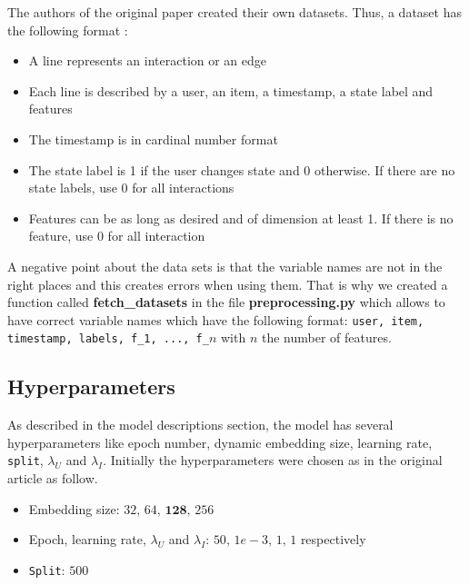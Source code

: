 The authors of the original paper created their own datasets. Thus, a dataset has the following format :
\begin{itemize}
    \item A line represents an interaction or an edge
    \item Each line is described by a user, an item, a timestamp, a state label and features
    \item The timestamp is in cardinal number format
    \item The state label is 1 if the user changes state and 0 otherwise. If there are no state labels, use 0 for all interactions
    \item Features can be as long as desired and of dimension at least 1. If there is no feature, use 0 for all interaction
\end{itemize}
A negative point about the data sets is that the variable names are not in the right places and this creates errors when using them. That is why we created a function called \textbf{fetch\_datasets} in the file \textbf{preprocessing.py} which allows to have correct variable names which have the following format: \texttt{user, item, timestamp, labels, f\_1, ..., f\_$n$} with $n$ the number of features.\\

\subsection*{Hyperparameters}

As described in the model descriptions section, the model has several hyperparameters like epoch number, dynamic embedding size, learning rate, \texttt{split}, $\lambda_U$ and $\lambda_I$. Initially the hyperparameters were chosen as in the original article as follow.

\begin{itemize}
    \item Embedding size: $32, \, 64, \, \boldsymbol{128}, \, 256$
    \item Epoch, learning rate, $\lambda_U$ and $\lambda_I$: $50, \, 1e-3, \, 1, \, 1$ respectively
    \item \texttt{Split}: $500$
\end{itemize}

